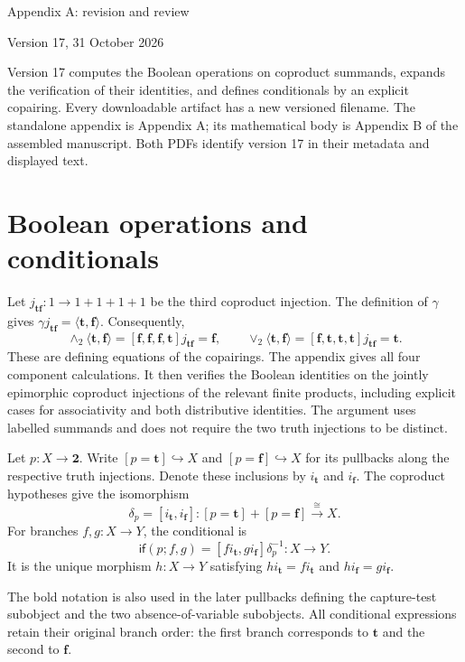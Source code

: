 \documentclass[10pt]{article}
\newcommand{\Two}{\mathbf2}
\begin{document}
{\LARGE Appendix A: revision and review}\par
{\large Version 17, 31 October 2026}\par

Version 17 computes the Boolean operations on coproduct summands, expands
the verification of their identities, and defines conditionals by an explicit copairing. Every downloadable artifact has a new versioned filename. The standalone appendix is
Appendix A; its mathematical body is Appendix B of the assembled manuscript.
Both PDFs identify version 17 in their metadata and displayed text.

\section*{Boolean operations and conditionals}
Let $j_{\mathbf{t}\mathbf{f}}:1\to1+1+1+1$ be the third coproduct
injection. The definition of $\gamma$ gives
$\gamma j_{\mathbf{t}\mathbf{f}}=\langle\mathbf{t},\mathbf{f}\rangle$.
Consequently,
\[
\wedge_2\langle\mathbf{t},\mathbf{f}\rangle
=[\mathbf{f},\mathbf{f},\mathbf{f},\mathbf{t}]j_{\mathbf{t}\mathbf{f}}
=\mathbf{f},\qquad
\vee_2\langle\mathbf{t},\mathbf{f}\rangle
=[\mathbf{f},\mathbf{t},\mathbf{t},\mathbf{t}]j_{\mathbf{t}\mathbf{f}}
=\mathbf{t}.
\]
These are defining equations of the copairings. The appendix gives all four
component calculations. It then verifies the Boolean identities on the jointly
epimorphic coproduct injections of the relevant finite products, including
explicit cases for associativity and both distributive identities. The argument
uses labelled summands and does not require the two truth injections to be distinct.

Let $p:X\to\Two$. Write $[p=\mathbf{t}]\hookrightarrow X$ and
$[p=\mathbf{f}]\hookrightarrow X$ for its pullbacks along the respective
truth injections. Denote these inclusions by $i_{\mathbf{t}}$ and
$i_{\mathbf{f}}$. The coproduct hypotheses give the isomorphism
\[
\delta_p=[i_{\mathbf{t}},i_{\mathbf{f}}]:
[p=\mathbf{t}]+[p=\mathbf{f}]\xrightarrow{\cong}X.
\]
For branches $f,g:X\to Y$, the conditional is
\[
\mathsf{if}(p;f,g)=[f i_{\mathbf{t}},g i_{\mathbf{f}}]\delta_p^{-1}:X\to Y.
\]
It is the unique morphism $h:X\to Y$ satisfying
$h i_{\mathbf{t}}=f i_{\mathbf{t}}$ and
$h i_{\mathbf{f}}=g i_{\mathbf{f}}$.

The bold notation is also used in the later pullbacks defining the
capture-test subobject and the two absence-of-variable subobjects.
All conditional expressions retain their original branch order:
the first branch corresponds to $\mathbf{t}$ and the second to $\mathbf{f}$.
\end{document}
